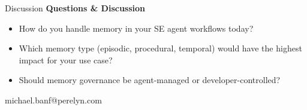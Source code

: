 \documentclass[aspectratio=169]{beamer}
\begin{document}

\begin{frame}{Discussion}
  \centering
  \vfill
  {\Large\bfseries Questions \& Discussion}
  \vfill

  \begin{itemize}
    \item How do you handle memory in your SE agent workflows today?
    \item Which memory type (episodic, procedural, temporal) would have
      the highest impact for your use case?
    \item Should memory governance be agent-managed or developer-controlled?
  \end{itemize}
  \vfill

  {\small michael.banf@perelyn.com}
\end{frame}

\begin{frame}[plain]
  \titlepage
\end{frame}
\end{document}
